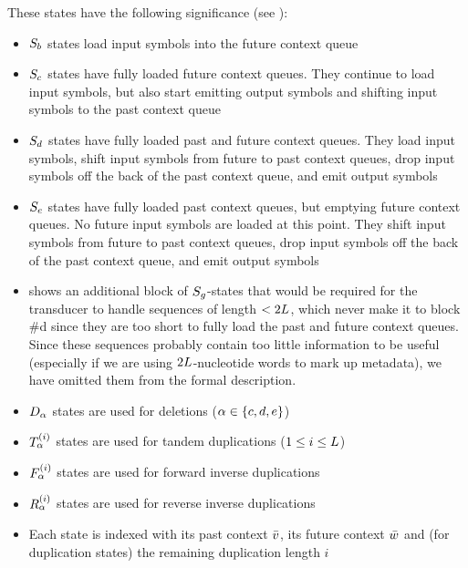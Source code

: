 \documentclass[english]{article}
\begin{document}
These states have the following significance (see ):
\begin{itemize}
  \item ${S}_{b}$ states load input symbols into the future context queue
  \item ${S}_{c}$ states have fully loaded future context queues. They continue to load input symbols, but also start emitting output symbols and shifting input symbols to the past context queue
  \item ${S}_{d}$ states have fully loaded past and future context queues. They load input symbols, shift input symbols from future to past context queues, drop input symbols off the back of the past context queue, and emit output symbols
  \item ${S}_{e}$ states have fully loaded past context queues, but emptying future context queues. No future input symbols are loaded at this point. They shift input symbols from future to past context queues, drop input symbols off the back of the past context queue, and emit output symbols
  \item {} shows an additional block of ${S}_{g}$-states that would be required for the transducer to handle sequences of length $<2L$, which never make it to block \#d since they are too short to fully load the past and future context queues. Since these sequences probably contain too little information to be useful (especially if we are using $2L$-nucleotide words to mark up metadata), we have omitted them from the formal description.
  \item ${D}_{\alpha}$ states are used for deletions ($\alpha \in \{ c, d, e \}$)
  \item ${T}_{\alpha}^{(i)}$ states are used for tandem duplications ($1 \leq i \leq L$)
  \item ${F}_{\alpha}^{(i)}$ states are used for forward inverse duplications
  \item ${R}_{\alpha}^{(i)}$ states are used for reverse inverse duplications
  \item Each state is indexed with its past context $\bar{v}$, its future context $\bar{w}$ and (for duplication states) the remaining duplication length $i$
\end{itemize}
\end{document}

